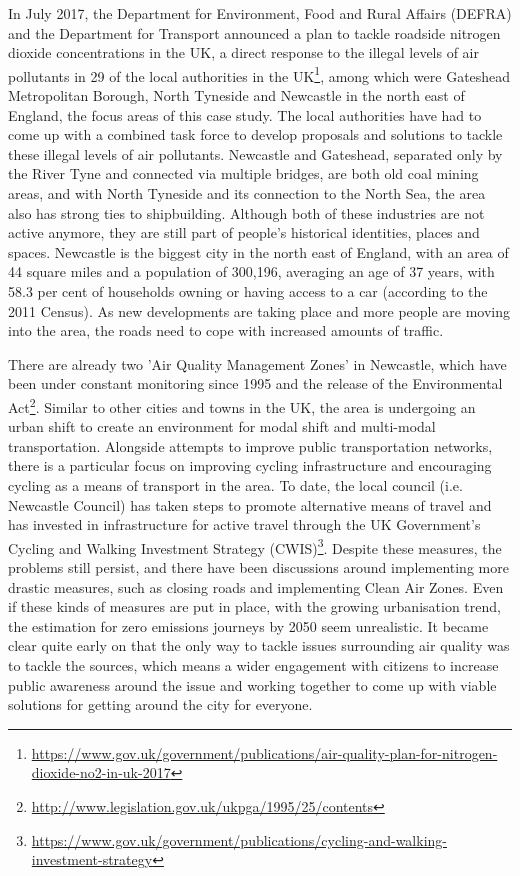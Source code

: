 In July 2017, the Department for Environment, Food and Rural Affairs (DEFRA) and the Department for Transport announced a plan to tackle roadside nitrogen dioxide concentrations in the UK, a direct response to the illegal levels of air pollutants in 29 of the local authorities in the UK\footnote{\url{https://www.gov.uk/government/publications/air-quality-plan-for-nitrogen-dioxide-no2-in-uk-2017}}, among which were Gateshead Metropolitan Borough, North Tyneside and Newcastle in the north east of England, the focus areas of this case study. The local authorities have had to come up with a combined task force to develop proposals and solutions to tackle these illegal levels of air pollutants. 
Newcastle and Gateshead, separated only by the River Tyne and connected via multiple bridges, are both old coal mining areas, and with North Tyneside and its connection to the North Sea, the area also has strong ties to shipbuilding. Although both of these industries are not active anymore, they are still part of people's historical identities, places and spaces. Newcastle is the biggest city in the north east of England, with an area of 44 square miles and a population of 300,196, averaging an age of 37 years, with 58.3 per cent of households owning or having access to a car (according to the 2011 Census). As new developments are taking place and more people are moving into the area, the roads need to cope with increased amounts of traffic.

There are already two 'Air Quality Management Zones' in Newcastle, which have been under constant monitoring since 1995 and the release of the Environmental Act\footnote{\url{http://www.legislation.gov.uk/ukpga/1995/25/contents}}. Similar to other cities and towns in the UK, the area is undergoing an urban shift to create an environment for modal shift and multi-modal transportation. Alongside attempts to improve public transportation networks, there is a particular focus on improving cycling infrastructure and encouraging cycling as a means of transport in the area. To date, the local council (i.e. Newcastle Council) has taken steps to promote alternative means of travel and has invested in infrastructure for active travel through the UK Government's Cycling and Walking Investment Strategy (CWIS)\footnote{\url{https://www.gov.uk/government/publications/cycling-and-walking-investment-strategy}}. Despite these measures, the problems still persist, and there have been discussions around implementing more drastic measures, such as closing roads and implementing Clean Air Zones. Even if these kinds of measures are put in place, with the growing urbanisation trend, the estimation for zero emissions journeys by 2050 seem unrealistic. It became clear quite early on that the only way to tackle issues surrounding air quality was to tackle the sources, which means a wider engagement with citizens to increase public awareness around the issue and working together to come up with viable solutions for getting around the city for everyone.

